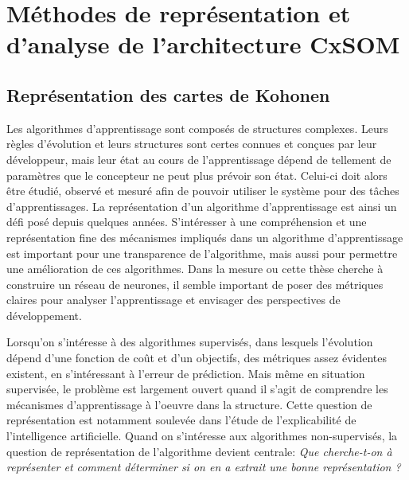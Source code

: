 \chapter{Méthodes de représentation et d'analyse de l'architecture CxSOM}
\graphicspath{{03-Representation/}}

\minitoc
\section{Représentation des cartes de Kohonen}

Les algorithmes d'apprentissage sont composés de structures complexes. Leurs règles d'évolution et leurs structures sont certes connues et conçues par leur développeur, mais leur état au cours de l'apprentissage dépend de tellement de paramètres que le concepteur ne peut plus prévoir son état. Celui-ci doit alors être étudié, observé et mesuré afin de pouvoir utiliser le système pour des tâches d'apprentissages. La représentation d'un algorithme d'apprentissage est ainsi un défi posé depuis quelques années. S'intéresser à une compréhension et une représentation fine des mécanismes impliqués dans un algorithme d'apprentissage est important pour une transparence de l'algorithme, mais aussi pour permettre une amélioration de ces algorithmes. Dans la mesure ou cette thèse cherche à construire un réseau de neurones, il semble important de poser des métriques claires pour analyser l'apprentissage et envisager des perspectives de développement. 

Lorsqu'on s'intéresse à des algorithmes supervisés, dans lesquels l'évolution dépend d'une fonction de coût et d'un objectifs, des métriques assez évidentes existent, en s'intéressant à l'erreur de prédiction. Mais même en situation supervisée, le problème est largement ouvert quand il s'agit de comprendre les mécanismes d'apprentissage à l'oeuvre dans la structure. Cette question de représentation est notamment soulevée dans l'étude de l'explicabilité de l'intelligence artificielle. Quand on s'intéresse aux algorithmes non-supervisés, la question de représentation de l'algorithme devient centrale: \emph{Que cherche-t-on à représenter et comment déterminer si on en a extrait une bonne représentation ?}

%


